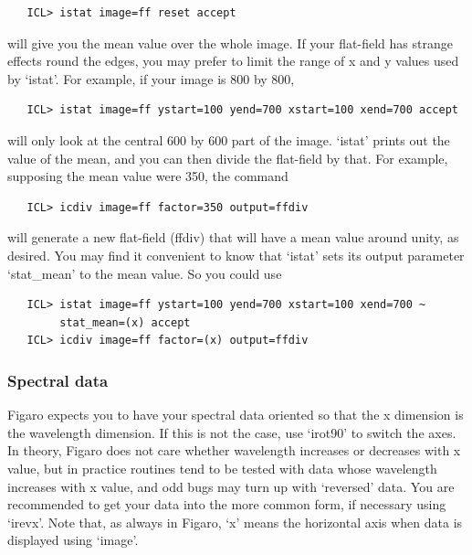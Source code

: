 \begin{verbatim}
   ICL> istat image=ff reset accept
\end{verbatim}

   will give you the mean value over the whole image.  If your
   flat-field has strange effects round the edges, you may prefer to
   limit the range of x and y values used by `istat'.  For example, if
   your image is 800 by 800,

\begin{verbatim}
   ICL> istat image=ff ystart=100 yend=700 xstart=100 xend=700 accept
\end{verbatim}

   will only look at the central 600 by 600 part of the image. `istat'
   prints out the value of the mean, and you can then divide the
   flat-field by that. For example, supposing the mean value were 350,
   the command

\begin{verbatim}
   ICL> icdiv image=ff factor=350 output=ffdiv
\end{verbatim}

   will generate a new flat-field (ffdiv) that will have a mean value
   around unity, as desired.  You may find it convenient to know that
   `istat' sets its output parameter `stat\_mean' to the mean value.
   So you could use

\begin{verbatim}
   ICL> istat image=ff ystart=100 yend=700 xstart=100 xend=700 ~
        stat_mean=(x) accept
   ICL> icdiv image=ff factor=(x) output=ffdiv
\end{verbatim}


\subsubsection{\label{techno1spectrum}Spectral data}

   Figaro expects you to have your spectral data oriented so that the x
   dimension is the wavelength dimension.  If this is not the case, use
   `irot90' to switch the axes.  In theory, Figaro does not care
   whether wavelength increases or decreases with x value, but in
   practice routines tend to be tested with data whose wavelength
   increases with x value, and odd bugs may turn up with `reversed'
   data.  You are recommended to get your data into the more common
   form, if necessary using `irevx'.  Note that, as always in Figaro,
   `x' means the horizontal axis when data is displayed using
   `image'.

